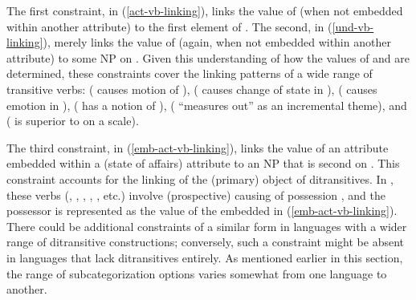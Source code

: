 \documentclass[output=paper
 	        ,biblatex
                ,babelshorthands
                ,newtxmath
                ,draftmode
                ,colorlinks, citecolor=brown
]{langscibook}
\begin{document}
\begin{exe}
	\ex\label{und-vb-linking}
\end{exe}

\begin{exe}
	\ex\label{emb-act-vb-linking}
\end{exe}


\noindent
The first constraint, in (\ref{act-vb-linking}), links the value of  (when not embedded
within another attribute) to the first element of \argst.  The second, in (\ref{und-vb-linking}),
merely links the value of  (again, when not embedded within another attribute) to some NP
on \argst.  Given this understanding of how the values of  and  are determined,
these constraints cover the linking patterns of a wide range of transitive verbs: 
( causes motion of ),  ( causes change of state in
),  ( causes emotion in ),  (
has a notion of ),  ( ``measures out''  as an
incremental theme), and  ( is superior to  on a scale).

The third constraint, in (\ref{emb-act-vb-linking}), links the value of an  attribute
embedded within a  (state of affairs)
attribute to an NP that is second on \argst.  This constraint accounts for the linking of the
(primary) object of ditransitives. In , these verbs (,
, , , , etc.) involve (prospective) causing of possession
\citep{Pinker1989,Goldberg1995}, and the possessor is represented as the value of the embedded
 in (\ref{emb-act-vb-linking}).  There could be additional constraints of a similar form
in languages with a wider range of ditransitive constructions; conversely, such a constraint might
be absent in languages that lack ditransitives entirely.  As mentioned earlier in this section, the
range of subcategorization options varies somewhat from one language to another.
\end{document}
